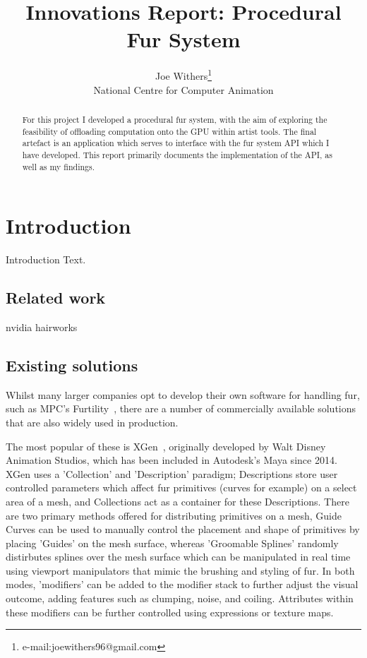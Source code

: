 \documentclass[]{acmsiggraph}
\title{Innovations Report: Procedural Fur System}
\author{Joe Withers\thanks{e-mail:joewithers96@gmail.com}\\National Centre for Computer Animation}
\begin{document}
\maketitle

\begin{abstract}
For this project I developed a procedural fur system, with the aim of exploring the feasibility of offloading computation onto the GPU within artist tools. The final artefact is an application which serves to interface with the fur system API which I have developed. This report primarily documents the implementation of the API, as well as my findings.
\end{abstract}

\section{Introduction} \label{sec:introduction}
Introduction Text.
\subsection{Related work} \label{sec:related}
nvidia hairworks

\subsection{Existing solutions} \label{sec:existing}
Whilst many larger companies opt to develop their own software for handling fur, such as MPC's Furtility~\cite{furtility}, there are a number of commercially available solutions that are also widely used in production.

The most popular of these is XGen~\cite{xgen}, originally developed by Walt Disney Animation Studios, which has been included in Autodesk's Maya since 2014. XGen uses a 'Collection' and 'Description' paradigm; Descriptions store user controlled parameters which affect fur primitives (curves for example) on a select area of a mesh, and Collections act as a container for these Descriptions. There are two primary methods offered for distributing primitives on a mesh, Guide Curves can be used to manually control the placement and shape of primitives by placing 'Guides' on the mesh surface, whereas 'Groomable Splines' randomly distirbutes splines over the mesh surface which can be manipulated in real time using viewport manipulators that mimic the brushing and styling of fur. In both modes, 'modifiers' can be added to the modifier stack to further adjust the visual outcome, adding features such as clumping, noise, and coiling. Attributes within these modifiers can be further controlled using expressions or texture maps.
\end{document}
